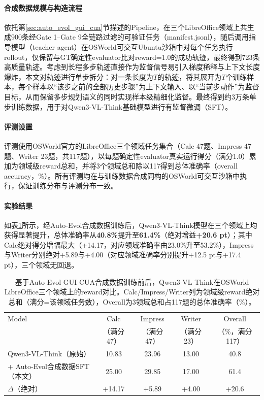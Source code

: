 \paragraph{合成数据规模与构造流程}
依托第\ref{sec:auto_evol_gui_cua}节描述的Pipeline，在三个LibreOffice领域上共生成900条经Gate 1--Gate 9全链路过滤的可验证任务（manifest.jsonl），随后调用指导模型（teacher agent）在OSWorld可交互Ubuntu沙箱中对每个任务执行rollout，仅保留与GT确定性evaluator比对reward=1.0的成功轨迹，最终得到723条高质量轨迹。考虑到长程多步轨迹直接作为监督信号易引入梯度稀释与上下文长度爆炸，本文对轨迹进行单步拆分：对一条长度为$T$的轨迹，将其展开为$T$个训练样本，每个样本以“该步之前的全部历史步骤”为上下文输入、以“当前步动作”为监督目标，从而保留多步规划语义的同时实现样本级精细化监督。最终得到约3万条单步训练数据，用于对Qwen3-VL-Think基础模型进行有监督微调（SFT）。

\paragraph{评测设置}
评测使用OSWorld官方的LibreOffice三个领域任务集合（Calc 47题、Impress 47题、Writer 23题，共117题），以每题确定性evaluator真实运行得分（满分1.0）累加为领域级reward总和，并将3个领域总和除以117得到总体准确率（overall accuracy，\%）。所有评测均在与训练数据合成同构的OSWorld可交互沙箱中执行，保证训练分布与评测分布一致。

\paragraph{实验结果}
如表\ref{tab:gui_cua_train_result}所示，经Auto-Evol合成数据训练后，Qwen3-VL-Think模型在三个领域上均获得显著提升，总体准确率从\textbf{40.8\%}提升至\textbf{61.4\%}（绝对增益\textbf{+20.6 pt}）；其中Calc绝对得分增幅最大（+14.17，对应领域准确率由23.0\%升至53.2\%），Impress与Writer分别绝对+5.89与+4.00（对应领域准确率分别提升+12.5 pt与+17.4 pt），三个领域无回退。

\begin{table}[htbp]
\centering
\caption{基于Auto-Evol GUI CUA合成数据训练前后，Qwen3-VL-Think在OSWorld LibreOffice三个领域上的reward对比。Calc/\allowbreak Impress/\allowbreak Writer列为领域级reward绝对总和（满分=该领域任务数），Overall为3领域总和占117题的总体准确率（\%）。}
\label{tab:gui_cua_train_result}
\small
\renewcommand{\arraystretch}{1.3}
\begin{tabular}{lcccc}
\toprule
Model & Calc & Impress & Writer & Overall \\
               & （满分47） & （满分47） & （满分23） & （\%，满分117） \\
\midrule
Qwen3-VL-Think（原始）              & 10.83 & 23.96 & 13.00 & 40.8 \\
\quad + Auto-Evol合成数据SFT（本文） & 25.00 & 29.85 & 17.00 & 61.4 \\
\midrule
$\Delta$（绝对）          & +14.17 & +5.89 & +4.00 & +20.6 \\
\bottomrule
\end{tabular}

\end{table}

